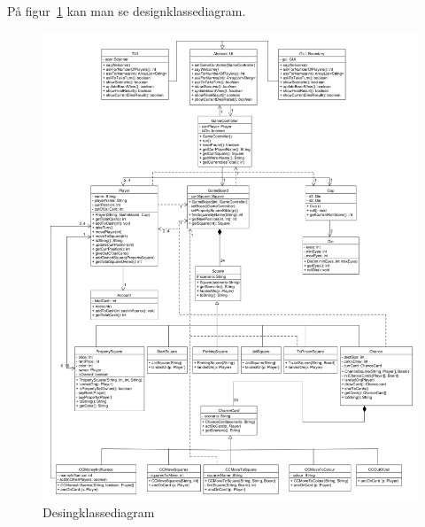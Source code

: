\documentclass[class=article, crop=false]{standalone}
\begin{document}
På figur~\ref{fig:DKD} kan man se designklassediagram.
    \begin{figure}[H]
        \centering
        \includegraphics[scale = 0.1]{diagrams_png/DKD.png}
        \caption{Desingklassediagram}\label{fig:DKD}
    \end{figure}
\end{document}
